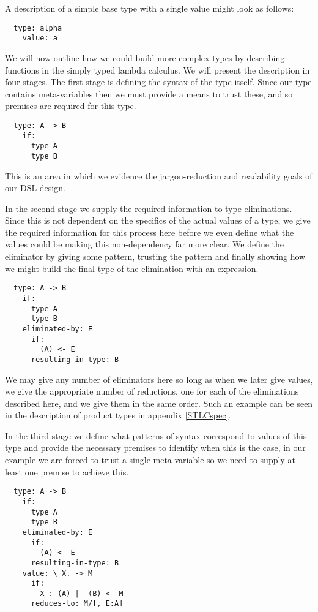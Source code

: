 A description of a simple base type with a single value might look as
follows:

\begin{BVerbatim}
  type: alpha
    value: a
\end{BVerbatim}

We will now outline how we could build more complex types by
describing functions in the simply typed lambda calculus. We will
present the description in four stages. The first stage is defining
the syntax of the type itself. Since our type contains meta-variables
then we must provide a means to trust these, and so premises are
required for this type.

\begin{BVerbatim}
  type: A -> B
    if:
      type A
      type B
\end{BVerbatim}

This is an area in which we evidence the jargon-reduction and
readability goals of our DSL design.

In the second stage we supply the required information to type
eliminations. Since this is not dependent on the specifics of the
actual values of a type, we give the required information for this
process here before we even define what the values could be making
this non-dependency far more clear. We define the eliminator by giving
some pattern, trusting the pattern and finally showing how we might
build the final type of the elimination with an expression.

\begin{BVerbatim}
  type: A -> B
    if:
      type A
      type B
    eliminated-by: E
      if:
        (A) <- E
      resulting-in-type: B
\end{BVerbatim}

We may give any number of eliminators here so long as when we later
give values, we give the appropriate number of reductions, one for
each of the eliminations described here, and we give them in the same
order. Such an example can be seen in the description of product types
in appendix \ref{STLCspec}.

In the third stage we define what patterns of syntax correspond to
values of this type and provide the necessary premises to identify
when this is the case, in our example we are forced to trust a single
meta-variable so we need to supply at least one premise to achieve
this.

\begin{BVerbatim}
  type: A -> B
    if:
      type A
      type B
    eliminated-by: E
      if:
        (A) <- E
      resulting-in-type: B
    value: \ X. -> M
      if:
        X : (A) |- (B) <- M
      reduces-to: M/[, E:A]
\end{BVerbatim}


